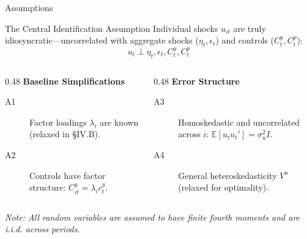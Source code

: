 \documentclass[aspectratio=169,11pt]{beamer}
\begin{document}
\begin{frame}[label=app_assumptions]{Assumptions}
    \vspace{-0.5em}
    \begin{block}{The Central Identification Assumption}
        Individual shocks $u_{it}$ are truly idiosyncratic—uncorrelated with aggregate shocks ($\eta_t, \epsilon_t$) and controls ($C_t^y, C_t^p$):
        \begin{equation}
            u_t \perp \eta_t, \epsilon_t, C_t^y, C_t^p
        \end{equation}
    \end{block}

    \vfill

    \begin{columns}[T]
        \begin{column}{0.48\textwidth}
            \textbf{Baseline Simplifications}
            \begin{description}
                \item[A1] Factor loadings $\lambda_i$ are known (relaxed in §IV.B).
                \item[A2] Controls have factor structure: $C_{it}^y = \lambda_i c_t^y$.
            \end{description}
        \end{column}
        \begin{column}{0.48\textwidth}
            \textbf{Error Structure}
            \begin{description}
                \item[A3] Homoskedastic and uncorrelated across $i$: $\mathbb{E}[u_t u_t'] = \sigma_u^2 I$.
                \item[A4] General heteroskedasticity $V^u$ (relaxed for optimality).
            \end{description}
        \end{column}
    \end{columns}

    \vfill
    \footnotesize
    \textit{Note: All random variables are assumed to have finite fourth moments and are i.i.d. across periods.}
    \vspace{0.1cm}
    \hfill \hyperlink{src_assumptions}{}
\end{frame}
\end{document}
